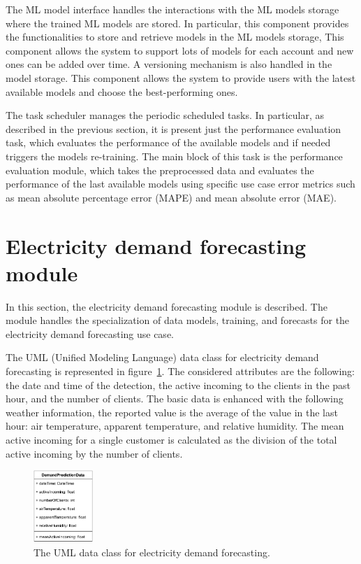 The ML model interface handles the interactions with the ML models storage where the trained ML models are stored.
In particular, this component provides the functionalities to store and retrieve models in the ML models storage,
This component allows the system to support lots of models for each account and new ones can be added over time.
A versioning mechanism is also handled in the model storage.
This component allows the system to provide users with the latest available models and choose the best-performing ones.

The task scheduler manages the periodic scheduled tasks.
In particular, as described in the previous section, it is present just the performance evaluation task, which evaluates the performance of the available models and if needed triggers the models re-training.
The main block of this task is the performance evaluation module, which takes the preprocessed data and evaluates the performance of the last available models using specific use case error metrics such as mean absolute percentage error (MAPE) and mean absolute error (MAE).


\section{Electricity demand forecasting module}
\label{sec:demandmodel}
\vspace{0.2 cm}

In this section, the electricity demand forecasting module is described.
The module handles the specialization of data models, training, and forecasts for the electricity demand forecasting use case.

The UML (Unified Modeling Language) data class for electricity demand forecasting is represented in figure~\ref{fig:umldemand}.
The considered attributes are the following: the date and time of the detection, the active incoming to the clients in the past hour, and the number of clients.
The basic data is enhanced with the following weather information, the reported value is the average of the value in the last hour: air temperature, apparent temperature, and relative humidity.
The mean active incoming for a single customer is calculated as the division of the total active incoming by the number of clients.

\begin{figure}[H]
\centering
\includegraphics[width=0.20\textwidth]{images/demand_prediction_uml}
\caption{The UML data class for electricity demand forecasting.}
\label{fig:umldemand}
\end{figure}

